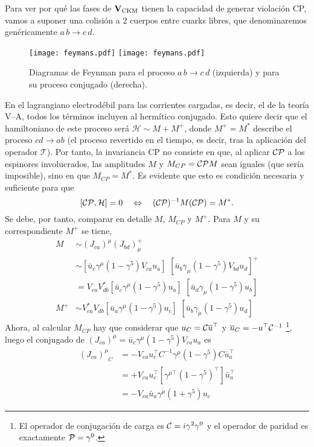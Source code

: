 \begin{subappendices}
Para ver por qué las fases de $\mathbf{V}_{\text{CKM}}$ tienen la capacidad de generar violación CP, vamos a suponer una colisión a 2 cuerpos entre cuarks libres, que denominaremos genéricamente $a\,b \rightarrow c\,d$.
\begin{figure}[H]
\centering
\texttt{[image: feymans.pdf]}
\hspace*{3cm}
\texttt{[image: feymans.pdf]}
\caption{Diagramas de Feynman para el proceso $a\,b \rightarrow c\,d$ (izquierda) y para su proceso conjugado (derecha).}	
\end{figure}
%
En el lagrangiano electrodébil para las corrientes cargadas, es decir, el de la teoría V--A,
todos los términos incluyen al hermítico conjugado. Esto quiere decir que el hamiltoniano de este proceso será $\mathcal{H} \sim M + M^+$, donde $M^+ = M^*$ describe el proceso $cd \rightarrow ab$ (el proceso revertido en el tiempo, es decir, tras la aplicación del operador $\mathcal{T}$). Por tanto, la invariancia CP no consiste en que, al aplicar $\mathcal{CP}$ a los espinores involucrados, las amplitudes $M$ y $M_{CP} = \mathcal{CP} M$ sean iguales (que sería imposible), sino en que $M_{CP} = M^*$. Es evidente que esto es condición necesaria y suficiente para que 
\[[\mathcal{CP},\mathcal{H}] = 0 \quad  \Leftrightarrow \quad  (\mathcal{CP})^{-1} M (\mathcal{CP}) = M^*  .\]
Se debe, por tanto, comparar en detalle $M$, $M_{CP}$ y $M^+$. Para $M$ y su correspondiente $M^+$ se tiene,
\begin{align*}
M & \sim (J_{ca})^{\mu} (J_{bd})_{\mu}^+ \\ & \sim [\bar u_c \gamma^{\mu} (1-\gamma^5) V_{ca} u_a ] \,\, [\bar u_b \gamma_{\mu} (1 -\gamma^5) V_{bd} u_d]^+	\\ & = V_{ca} V_{db}^* [\bar u_c \gamma^{\mu} (1-\gamma^5)  u_a ] \,\, [\bar u_d \gamma_{\mu} (1 -\gamma^5) u_b] \\ M^+ & \sim V_{ca}^* V_{db}[\bar u_a \gamma^{\mu} (1-\gamma^5)  u_c ] \,\, [\bar u_b \gamma_{\mu} (1 -\gamma^5) u_d]
\end{align*}
%
Ahora, al calcular $M_{CP}$ hay que considerar que $u_C = \mathcal{C} \overline{u} ^{\top}$ y $\overline{u}_C = - u^{\top} \mathcal{C}^{-1}$ \footnote{El operador de conjugación de carga es $\mathcal{C} = i \gamma^2 \gamma^0$ y el operador  de paridad es exactamente $\mathcal{P} = \gamma^0$.},
luego el conjugado de $ (J_{ca})^{\mu} = \bar u_c \gamma^{\mu} (1-\gamma^5) V_{ca} u_a$ es
\begin{align*}
(J_{ca})_{\phantom{\mu} C}^{\mu} &= -V_{ca} u_c^{\top} C^{-1} \gamma^{\mu} (1-\gamma^5) C \bar{u}_a^{\top}\\ & = + V_{ca} u_c^{\top} [\gamma^{\mu \top} (1- \gamma^5)^{\top}] \bar{u}_a^{\top} \\ &= - V_{ca} \bar{u}_a \gamma^{\mu } (1+ \gamma^5) u_c	

\end{align*}
\end{subappendices}

